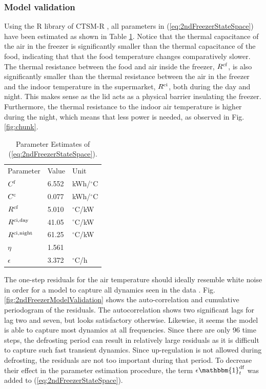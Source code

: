 \subsubsection{Model validation}

Using the R library of CTSM-R \cite{juhl2016ctsmr}, all parameters in (\ref{eq:2ndFreezerStateSpace}) have been estimated as shown in Table \ref{tab:parameter_estimates}. Notice that the thermal capacitance of the air in the freezer is significantly smaller than the thermal capacitance of the food, indicating that that the food temperature changes comparatively slower. The thermal resistance between the food and air inside the freezer, $R^{\rm{cf}}$, is also significantly smaller than the thermal resistance between the air in the freezer and the indoor temperature in the supermarket, $R^{\rm{ci}}$, both during the day and night. This makes sense as the lid acts as a physical barrier insulating the freezer. Furthermore, the thermal resistance to the indoor air temperature is higher during the night, which means that less power is needed, as  observed in Fig. \ref{fig:chunk}.

\begin{table}[!t]
    \caption{Parameter Estimates of (\ref{eq:2ndFreezerStateSpace}).}
    \label{tab:parameter_estimates}
    \centering
    \begin{tabular}[b]{|l|l|l|}
        \hline
        Parameter              & Value & Unit            \\ \hhline{|=|=|=|}
        $C^{\rm{f}}$                  & 6.552 & kWh/$^{\circ}$C \\
        $C^{\rm{c}}$                  & 0.077 & kWh/$^{\circ}$C \\
        $R^{\rm{cf}}$               & 5.010 & $^{\circ}$C/kW  \\
        $R^{\rm{ci}, \text{day}}$   & 41.05 & $^{\circ}$C/kW  \\
        $R^{\rm{ci}, \text{night}}$ & 61.25 & $^{\circ}$C/kW  \\
        $\eta$                 & 1.561 &                 \\
        $\epsilon$             & 3.372 & $^{\circ}$C/h   \\ \hline
    \end{tabular}
\end{table}


The one-step residuals for the air temperature should ideally resemble white noise in order for a model to capture all dynamics seen in the data \cite{madsen2007time}. Fig. \ref{fig:2ndFreezerModelValidation} shows the auto-correlation and cumulative periodogram of the residuals. The autocorrelation shows two significant lags for lag two and seven, but looks satisfactory otherwise. Likewise,  it seems the model is able to capture most dynamics at all frequencies. 
%
Since there are only 96 time steps, the defrosting period can result in relatively large residuals as it is difficult to capture such fast transient dynamics. Since up-regulation is not allowed during defrosting, the residuals are not too important during that period. To decrease their effect in the parameter estimation procedure, the term $ \epsilon \mathbbm{1}^{\text{df}}_{t}$ was added to (\ref{eq:2ndFreezerStateSpace}). 

